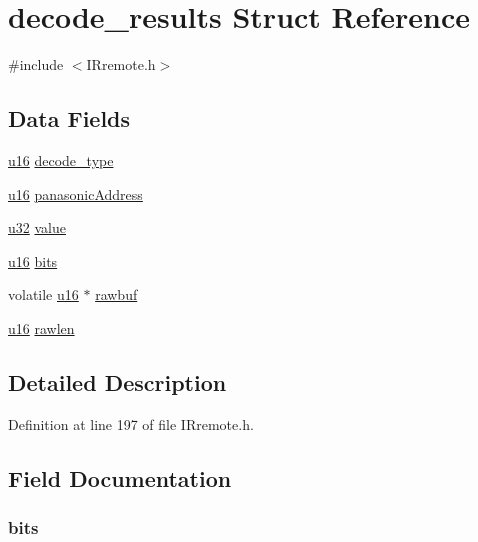 \hypertarget{structdecode__results}{\section{decode\-\_\-results Struct Reference}
\label{structdecode__results}
}


{\ttfamily \#include $<$I\-Rremote.\-h$>$}

\subsection*{Data Fields}
\begin{DoxyCompactItemize}
\item 
\hyperlink{p8_2pinguino_2core_2typedef_8h_a50b0d1c7a54fa09a64a3ac111c778520}{u16} \hyperlink{structdecode__results_ac4756bd87be2b8e185354584b24cff5e}{decode\-\_\-type}
\item 
\hyperlink{p8_2pinguino_2core_2typedef_8h_a50b0d1c7a54fa09a64a3ac111c778520}{u16} \hyperlink{structdecode__results_a7d11bce20bd4dd8aa547a7400137404e}{panasonic\-Address}
\item 
\hyperlink{p8_2pinguino_2core_2typedef_8h_a2caf5cd7bcdbe1eefa727f44ffb10bac}{u32} \hyperlink{structdecode__results_ad21d3c023f49c2da4c77f84340fd6b26}{value}
\item 
\hyperlink{p8_2pinguino_2core_2typedef_8h_a50b0d1c7a54fa09a64a3ac111c778520}{u16} \hyperlink{structdecode__results_a90f613f5d166dea9f7feb751d13bfd5d}{bits}
\item 
volatile \hyperlink{p8_2pinguino_2core_2typedef_8h_a50b0d1c7a54fa09a64a3ac111c778520}{u16} $\ast$ \hyperlink{structdecode__results_a07b0ebd92141cf1bdd9178daab29c040}{rawbuf}
\item 
\hyperlink{p8_2pinguino_2core_2typedef_8h_a50b0d1c7a54fa09a64a3ac111c778520}{u16} \hyperlink{structdecode__results_ad02b5d14a59e79e0a330e030a7cfdaf1}{rawlen}
\end{DoxyCompactItemize}


\subsection{Detailed Description}


Definition at line 197 of file I\-Rremote.\-h.



\subsection{Field Documentation}
\hypertarget{structdecode__results_a90f613f5d166dea9f7feb751d13bfd5d}{
\subsubsection[{bits}]{ bits}}\label{structdecode__results_a90f613f5d166dea9f7feb751d13bfd5d}


